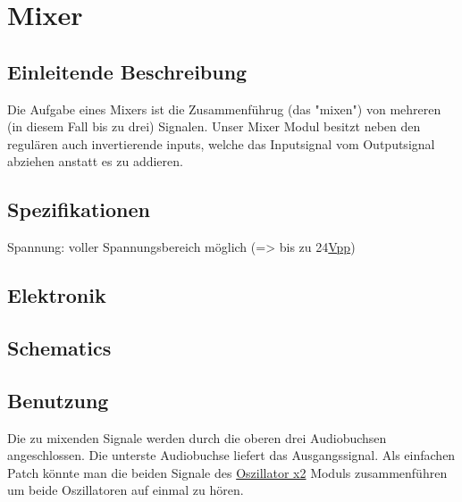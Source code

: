 \section{Mixer}
\label{sec:org6ef1de2}
\subsection{Einleitende Beschreibung}
\label{sec:orgefd4efb}
Die Aufgabe eines Mixers ist die Zusammenführug (das "mixen") von mehreren (in diesem Fall bis zu drei) Signalen. Unser Mixer Modul besitzt neben den regulären auch invertierende inputs, welche das Inputsignal vom Outputsignal abziehen anstatt es zu addieren.
\subsection{Spezifikationen}
\label{sec:orgf7e4855}
Spannung: voller Spannungsbereich möglich (=> bis zu 24\href{file:///home/felixp/Documents/diplomarbeit/dokumentation/content/hauptteil.org}{Vpp})
\subsection{Elektronik}
\label{sec:org63838fc}
\subsection{Schematics}
\label{sec:org9cf894e}
\subsection{Benutzung}
\label{sec:orga527c50}
Die zu mixenden Signale werden durch die oberen drei Audiobuchsen angeschlossen. Die unterste Audiobuchse liefert das Ausgangssignal. Als einfachen Patch könnte man die beiden Signale des \href{oscillator.org}{Oszillator x2} Moduls zusammenführen um beide Oszillatoren auf einmal zu hören.
